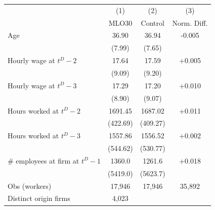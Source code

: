 {
\begin{tabular}{lccc}
\hline\hline
 & (1) & (2) & (3) \\
 & MLO30 & Control & Norm. Diff. \\
\hline
Age & 36.90 & 36.94 & -0.005 \\
 & (7.99) & (7.65) &  \\
Hourly wage at $t^D-2$ & 17.64 & 17.59 & +0.005 \\
 & (9.09) & (9.20) &  \\
Hourly wage at $t^D-3$ & 17.29 & 17.20 & +0.010 \\
 & (8.90) & (9.07) &  \\
Hours worked at $t^D-2$ & 1691.45 & 1687.02 & +0.011 \\
 & (422.69) & (409.27) &  \\
Hours worked at $t^D-3$ & 1557.86 & 1556.52 & +0.002 \\
 & (544.62) & (530.77) &  \\
\# employees at firm at $t^D-1$ & 1360.0 & 1261.6 & +0.018 \\
 & (5419.0) & (5623.7) &  \\
\hline
Obs (workers) & 17,946 & 17,946 & 35,892 \\
Distinct origin firms & 4,023 &  &  \\
\hline\hline
\end{tabular}
}
